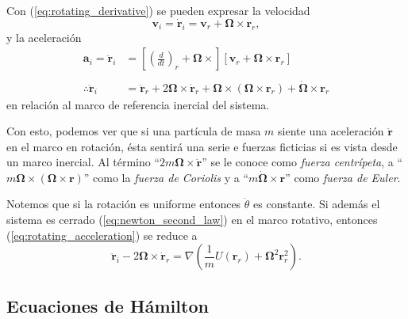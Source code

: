 Con (\ref{eq:rotating_derivative}) se pueden expresar la velocidad 
\begin{equation}
 \mathbf{v}_i = \dot{\mathbf{r}}_i = \mathbf{v}_r + \mathbf{\Omega} \times \mathbf{r}_r,
 \label{eq:rotating_velocity}
\end{equation}
y la aceleración
\begin{align}
 \mathbf{a}_i = \ddot{\mathbf{r}}_i &= \left[ \left( \frac{d}{dt}\right)_r + \mathbf{\Omega} \times \right]\left[ \mathbf{v}_r + \mathbf{\Omega} \times \mathbf{r}_r \right] \nonumber \\
 \nonumber \\
 \therefore \ddot{\mathbf{r}}_i &= \ddot{\mathbf{r}}_r + 2\mathbf{\Omega} \times \mathbf{\dot{r}}_r + \mathbf{\Omega} \times \left( \mathbf{\Omega} \times \mathbf{r}_r \right) + \dot{\mathbf{\Omega}} \times \mathbf{r}_r
 \label{eq:rotating_acceleration}
\end{align}
en relación al marco de referencia inercial del sistema. 

Con esto, podemos ver que si una partícula de masa $m$ siente una aceleración $\ddot{\mathbf{r}}$ en el marco en rotación, ésta sentirá una serie e fuerzas ficticias si es vista desde un marco inercial. Al término ``$2 m \mathbf{\Omega} \times \dot{\mathbf{r}}$'' se le conoce como \textit{fuerza centrípeta}, a ``$m \mathbf{\Omega} \times ( \mathbf{\Omega} \times \mathbf{r} )$'' como la \textit{fuerza de Coriolis} y a ``$m \dot{\mathbf{\Omega}} \times \mathbf{r}$'' como \textit{fuerza de Euler}.

Notemos que si la rotación es uniforme entonces $\dot{\theta}$ es constante. Si además el sistema es cerrado (\ref{eq:newton_second_law}) en el marco rotativo, entonces (\ref{eq:rotating_acceleration}) se reduce a 
\begin{equation}
 \ddot{\mathbf{r}}_i - 2\mathbf{\Omega} \times \dot{\mathbf{r}}_r = \nabla \left( \frac{1}{m}U(\mathbf{r}_r) +  \mathbf{\Omega}^2 \mathbf{r}_r^2 \right).
\end{equation}


\subsection{Ecuaciones de Hámilton}
\label{sec:hamilton}

